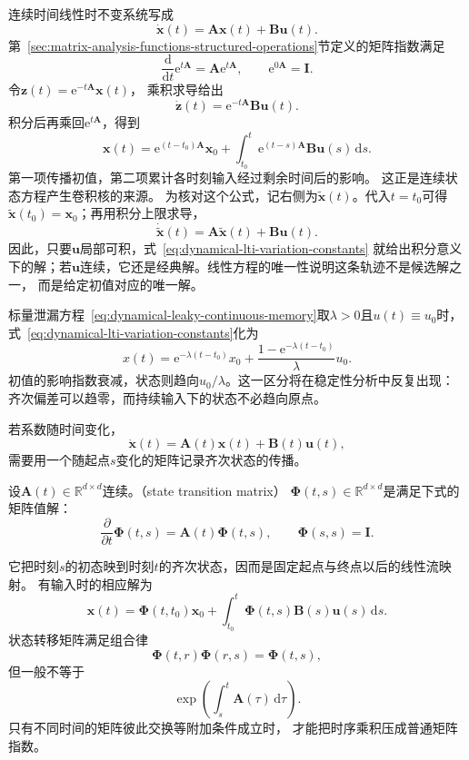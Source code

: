 连续时间线性时不变系统写成
\begin{equation}
	\dot{\bm{x}}(t) = \bm{A}\bm{x}(t)+\bm{B}\bm{u}(t). \label{eq:dynamical-lti-continuous}
\end{equation}
第~\ref{sec:matrix-analysis-functions-structured-operations}节定义的矩阵指数满足
\[
	\frac{\mathrm{d}}{\mathrm{d}t}\mathrm{e}^{t\bm{A}}= \bm{A}\mathrm{e}^{t\bm{A}},
	\qquad \mathrm{e}^{0\bm{A}}=\bm{I}.
\]
令$\bm{z}(t)=\mathrm{e}^{-t\bm{A}}\bm{x}(t)$， 乘积求导给出
\[
	\dot{\bm{z}}(t) = \mathrm{e}^{-t\bm{A}}\bm{B}\bm{u}(t).
\]
积分后再乘回$\mathrm{e}^{t\bm{A}}$，得到
\begin{equation}
	\bm{x}(t) = \mathrm{e}^{(t-t_0)\bm{A}}\bm{x}_{0}+ \int_{t_0}^{t}\mathrm{e}^{(t-s)\bm{A}}
	\bm{B}\bm{u}(s)\,\mathrm{d}s. \label{eq:dynamical-lti-variation-constants}
\end{equation}
第一项传播初值，第二项累计各时刻输入经过剩余时间后的影响。
这正是连续状态方程产生卷积核的来源。
为核对这个公式，记右侧为$\widetilde{\bm{x}}(t)$。代入$t=t_0$可得
$\widetilde{\bm{x}}(t_0)=\bm{x}_0$；再用积分上限求导，
\[
	\dot{\widetilde{\bm{x}}}(t)
	=\bm{A}\widetilde{\bm{x}}(t)+\bm{B}\bm{u}(t).
\]
因此，只要$\bm{u}$局部可积，式~\eqref{eq:dynamical-lti-variation-constants}
就给出积分意义下的解；若$\bm{u}$连续，它还是经典解。线性方程的唯一性说明这条轨迹不是候选解之一，
而是给定初值对应的唯一解。

标量泄漏方程~\eqref{eq:dynamical-leaky-continuous-memory}取$\lambda>0$且$u(t)\equiv u_0$时，
式~\eqref{eq:dynamical-lti-variation-constants}化为
\[
	x(t)=\mathrm{e}^{-\lambda(t-t_0)}x_0
	+\frac{1-\mathrm{e}^{-\lambda(t-t_0)}}{\lambda}u_0.
\]
初值的影响指数衰减，状态则趋向$u_0/\lambda$。这一区分将在稳定性分析中反复出现：
齐次偏差可以趋零，而持续输入下的状态不必趋向原点。

若系数随时间变化，
\[
	\dot{\bm{x}}(t) = \bm{A}(t)\bm{x}(t)+\bm{B}(t)\bm{u}(t),
\]
需要用一个随起点$s$变化的矩阵记录齐次状态的传播。
\begin{definition}[状态转移矩阵]
\label{def:dynamical-state-transition-matrix}
设$\bm A(t)\in\mathbb R^{d\times d}$连续。（state transition matrix）
$\bm\Phi(t,s)\in\mathbb R^{d\times d}$是满足下式的矩阵值解：
\begin{equation}
	\frac{\partial}{\partial t}\bm{\Phi}(t,s) = \bm{A}(t)\bm{\Phi}(t,s), \qquad \bm
	{\Phi}(s,s)=\bm{I}. \label{eq:dynamical-state-transition-matrix}
\end{equation}
\end{definition}
它把时刻$s$的初态映到时刻$t$的齐次状态，因而是固定起点与终点以后的线性流映射。
有输入时的相应解为
\begin{equation}
	\bm{x}(t) = \bm{\Phi}(t,t_{0})\bm{x}_{0}+ \int_{t_0}^{t}\bm{\Phi}(t,s)\bm{B}(s)
	\bm{u}(s)\,\mathrm{d}s. \label{eq:dynamical-ltv-variation-constants}
\end{equation}
状态转移矩阵满足组合律
\[
  \bm{\Phi}(t,r)\bm{\Phi}(r,s)=\bm{\Phi}(t,s),
\]
但一般不等于
\[
  \exp\left(\int_{s}^{t}\bm{A}(\tau)\,\mathrm{d}\tau\right).
\]
只有不同时间的矩阵彼此交换等附加条件成立时，
才能把时序乘积压成普通矩阵指数。

